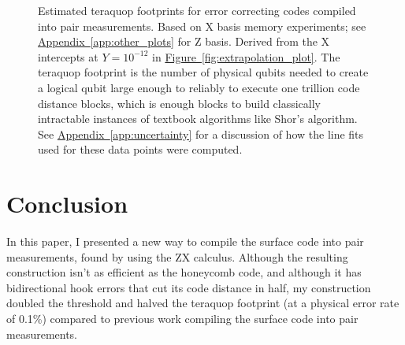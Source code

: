 \documentclass[onecolumn,unpublished,a4paper]{quantumarticle}
\theoremstyle{definition}
\theoremstyle{definition}
\theoremstyle{definition}
\DeclareRobustCommand{\app}[1]{\hyperref[app:#1]{Appendix~\ref*{app:#1}}}
\newcommand{\fig}[1]{\hyperref[fig:#1]{Figure~\ref*{fig:#1}}}
\begin{document}
\begin{figure}[h!]
    \centering
    \caption{
        Estimated teraquop footprints for error correcting codes compiled into pair measurements.
        Based on X basis memory experiments; see \app{other_plots} for Z basis.
        Derived from the X intercepts at $Y=10^{-12}$ in \fig{extrapolation_plot}.
        The teraquop footprint is the number of physical qubits needed to create a logical qubit large enough to reliably to execute one trillion code distance blocks, which is enough blocks to build classically intractable instances of textbook algorithms like Shor's algorithm.
        See \app{uncertainty} for a discussion of how the line fits used for these data points were computed.
    }
    \label{fig:footprint_plot}
\end{figure}


\section{Conclusion}
\label{sec:conclusion}

In this paper, I presented a new way to compile the surface code into pair measurements, found by using the ZX calculus.
Although the resulting construction isn't as efficient as the honeycomb code, and although it has bidirectional hook errors that cut its code distance in half, my construction doubled the threshold and halved the teraquop footprint (at a physical error rate of 0.1\%) compared to previous work compiling the surface code into pair measurements.
\end{document}
